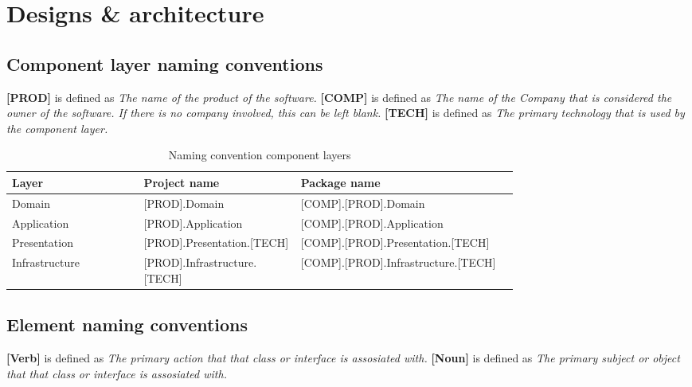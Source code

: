 \chapter{Designs \& architecture} \label{appendix_designs} 

\section{Component layer naming conventions} \label{appendix_component_naming_convention}

\textbf{[PROD]} is defined as \textit{The name of the product of the software.} \newline 
\textbf{[COMP]} is defined as \textit{The name of the Company that is considered the owner of the software. If
there is no company involved, this can be left blank.} \newline 
\textbf{[TECH]} is defined as \textit{The primary technology that is used by the component layer.} 

\begin{table}[H]
    \footnotesize
    \begin{tabular}{ l p{0.31\linewidth} p{0.43\linewidth} }
    \hline
    \textbf{Layer} & \textbf{Project name} & \textbf{Package name} \\ 
    \hline
    Domain & [PROD].Domain & [COMP].[PROD].Domain \\
    Application & [PROD].Application & [COMP].[PROD].Application \\
    Presentation & [PROD].Presentation.[TECH] & [COMP].[PROD].Presentation.[TECH] \\
    Infrastructure & [PROD].Infrastructure.[TECH] & [COMP].[PROD].Infrastructure.[TECH]
    \\ \hline
    \end{tabular}
\caption{Naming convention component layers}
\label{table:component_naming_convention}
\end{table}

\section{Element naming conventions} \label{appendix_element_naming_convention}

\textbf{[Verb]} is defined as \textit{The primary action that that class or interface is assosiated with.} \newline 
\textbf{[Noun]} is defined as \textit{The primary subject or object that that class or interface is assosiated with.} 

